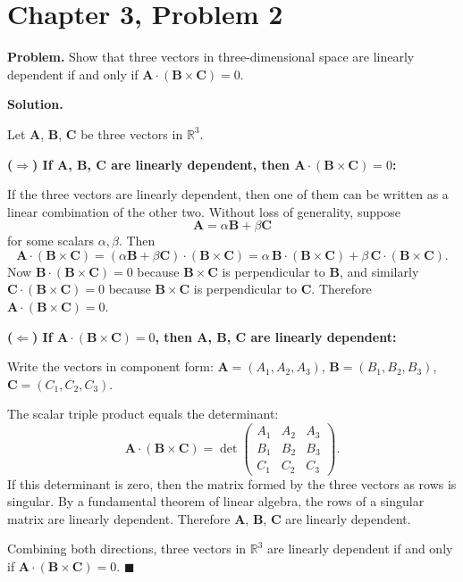 \documentclass[12pt]{article}
\begin{document}
\section*{Chapter 3, Problem 2}

\textbf{Problem.} Show that three vectors in three-dimensional space are linearly dependent if and only if $\mathbf{A} \cdot (\mathbf{B} \times \mathbf{C}) = 0$.

\bigskip
\textbf{Solution.}

Let $\mathbf{A}$, $\mathbf{B}$, $\mathbf{C}$ be three vectors in $\mathbb{R}^3$.

\medskip
\textbf{($\Rightarrow$) If $\mathbf{A}$, $\mathbf{B}$, $\mathbf{C}$ are linearly dependent, then $\mathbf{A}\cdot(\mathbf{B}\times\mathbf{C})=0$:}

If the three vectors are linearly dependent, then one of them can be written as a linear combination of the other two. Without loss of generality, suppose
\[
\mathbf{A} = \alpha \mathbf{B} + \beta \mathbf{C}
\]
for some scalars $\alpha, \beta$. Then
\[
\mathbf{A}\cdot(\mathbf{B}\times\mathbf{C}) = (\alpha \mathbf{B} + \beta \mathbf{C})\cdot(\mathbf{B}\times\mathbf{C}) = \alpha\,\mathbf{B}\cdot(\mathbf{B}\times\mathbf{C}) + \beta\,\mathbf{C}\cdot(\mathbf{B}\times\mathbf{C}).
\]
Now $\mathbf{B}\cdot(\mathbf{B}\times\mathbf{C})=0$ because $\mathbf{B}\times\mathbf{C}$ is perpendicular to $\mathbf{B}$, and similarly $\mathbf{C}\cdot(\mathbf{B}\times\mathbf{C})=0$ because $\mathbf{B}\times\mathbf{C}$ is perpendicular to $\mathbf{C}$. Therefore $\mathbf{A}\cdot(\mathbf{B}\times\mathbf{C})=0$.

\medskip
\textbf{($\Leftarrow$) If $\mathbf{A}\cdot(\mathbf{B}\times\mathbf{C})=0$, then $\mathbf{A}$, $\mathbf{B}$, $\mathbf{C}$ are linearly dependent:}

Write the vectors in component form:
$\mathbf{A} = (A_1, A_2, A_3)$, $\mathbf{B} = (B_1, B_2, B_3)$, $\mathbf{C} = (C_1, C_2, C_3)$.

The scalar triple product equals the determinant:
\[
\mathbf{A}\cdot(\mathbf{B}\times\mathbf{C}) = \det\begin{pmatrix} A_1 & A_2 & A_3 \\ B_1 & B_2 & B_3 \\ C_1 & C_2 & C_3 \end{pmatrix}.
\]
If this determinant is zero, then the matrix formed by the three vectors as rows is singular. By a fundamental theorem of linear algebra, the rows of a singular matrix are linearly dependent. Therefore $\mathbf{A}$, $\mathbf{B}$, $\mathbf{C}$ are linearly dependent.

\medskip
Combining both directions, three vectors in $\mathbb{R}^3$ are linearly dependent if and only if $\mathbf{A}\cdot(\mathbf{B}\times\mathbf{C})=0$. \hfill $\blacksquare$
\end{document}
